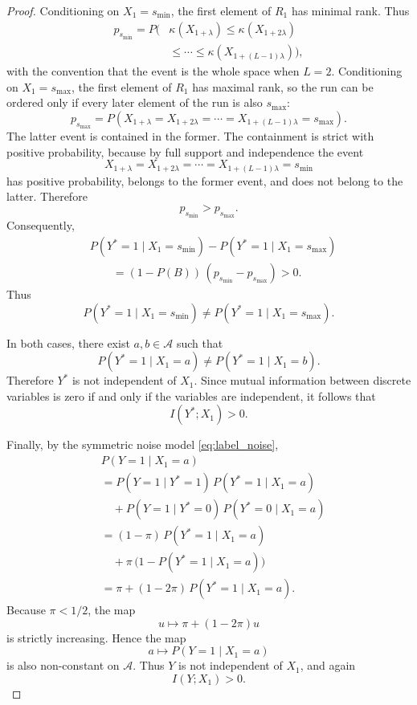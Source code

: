 \documentclass{article} %
\theoremstyle{plain}
\theoremstyle{definition}
\theoremstyle{remark}
\begin{document}
\begin{proof}
Conditioning on $X_1=s_{\min}$, the first element of $R_1$ has minimal
rank. Thus
\[
\begin{aligned}
p_{s_{\min}}
=
P\bigl(
&\kappa(X_{1+\lambda})
\leq
\kappa(X_{1+2\lambda})\\
&\leq
\cdots
\leq
\kappa(X_{1+(L-1)\lambda})
\bigr),
\end{aligned}
\]
with the convention that the event is the whole space when $L=2$.
Conditioning on $X_1=s_{\max}$, the first element of $R_1$ has maximal rank,
so the run can be ordered only if every later element of the run is also
$s_{\max}$:
\[
p_{s_{\max}}
=
P\!\left(
X_{1+\lambda}=X_{1+2\lambda}=\cdots=X_{1+(L-1)\lambda}=s_{\max}
\right).
\]
The latter event is contained in the former. The containment is strict with
positive probability, because by full support and independence the event
\[
X_{1+\lambda}=X_{1+2\lambda}=\cdots=X_{1+(L-1)\lambda}=s_{\min}
\]
has positive probability, belongs to the former event, and does not belong to
the latter. Therefore
\[
p_{s_{\min}}>p_{s_{\max}}.
\]
Consequently,
\begin{align*}
&P(Y^*=1\mid X_1=s_{\min})
-
P(Y^*=1\mid X_1=s_{\max})
\\
&\qquad =
(1-P(B))\,(p_{s_{\min}}-p_{s_{\max}})
>0.
\end{align*}
Thus
\[
P(Y^*=1\mid X_1=s_{\min})
\neq
P(Y^*=1\mid X_1=s_{\max}).
\]

In both cases, there exist $a,b\in\mathcal{A}$ such that
\[
P(Y^*=1\mid X_1=a)\neq P(Y^*=1\mid X_1=b).
\]
Therefore $Y^*$ is not independent of $X_1$. Since mutual information
between discrete variables is zero if and only if the variables are
independent, it follows that
\[
I(Y^*;X_1)>0.
\]

Finally, by the symmetric noise model \eqref{eq:label_noise},
\begin{align*}
&P(Y=1\mid X_1=a)\\
&=
P(Y=1\mid Y^*=1)\,P(Y^*=1\mid X_1=a)
\\
&\quad+
P(Y=1\mid Y^*=0)\,P(Y^*=0\mid X_1=a)
\\
&=
(1-\pi)\,P(Y^*=1\mid X_1=a)\\
&\quad+
\pi\,\bigl(1-P(Y^*=1\mid X_1=a)\bigr)
\\
&=
\pi + (1-2\pi)\,P(Y^*=1\mid X_1=a).
\end{align*}
Because $\pi<1/2$, the map
\[
u \longmapsto \pi + (1-2\pi)u
\]
is strictly increasing. Hence the map
\[
a \longmapsto P(Y=1\mid X_1=a)
\]
is also non-constant on $\mathcal{A}$. Thus $Y$ is not independent of $X_1$,
and again
\[
I(Y;X_1)>0.
\]
\end{proof}
\end{document}
